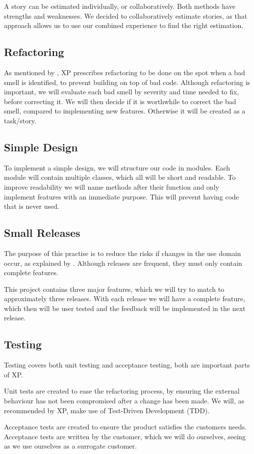 A story can be estimated individually, or collaboratively. Both methods have strengths and weaknesses.
We decided to collaboratively estimate stories, as that approach allows us to use our combined experience to find the right estimation.

\subsection{Refactoring}
As mentioned by \citet[p. ]{xp:explored}, XP prescribes refactoring to be done on the spot when a bad smell is identified, to prevent building on top of bad code.
Although refactoring is important, we will evaluate each bad smell by severity and time needed to fix, before correcting it.
We will then decide if it is worthwhile to correct the bad smell, compared to implementing new features. Otherwise it will be created as a task/story.

\subsection{Simple Design}
To implement a simple design, we will structure our code in modules.
Each module will contain multiple classes, which all will be short and readable.
To improve readability we will name methods after their function and only implement features with an immediate purpose. This will prevent having code that is never used.

\subsection{Small Releases}
The purpose of this practise is to reduce the risks if changes in the use domain occur, as explained by \citet[p. ]{xp:explored}.
Although releases are frequent, they must only contain complete features.

This project contains three major features, which we will try to match to approximately three releases.
With each release we will have a complete feature, which then will be user tested and the feedback will be implemented in the next release.

\subsection{Testing}
Testing covers both unit testing and acceptance testing, both are important parts of XP.

Unit tests are created to ease the refactoring process, by ensuring the external behaviour has not been compromised after a change has been made.
We will, as recommended by XP, make use of Test-Driven Development (TDD).

Acceptance tests are created to ensure the product satisfies the customers needs.
Acceptance tests are written by the customer, which we will do ourselves, seeing as we use ourselves as a surrogate customer.
